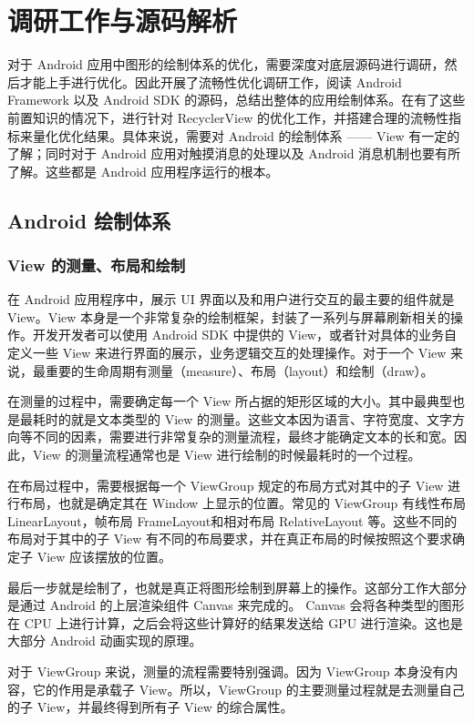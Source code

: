\chapter{调研工作与源码解析}

对于 Android 应用中图形的绘制体系的优化，需要深度对底层源码进行调研，然后才能上手进行优化。因此开展了流畅性优化调研工作，阅读 Android Framework 以及 Android SDK 的源码，总结出整体的应用绘制体系。在有了这些前置知识的情况下，进行针对 RecyclerView 的优化工作，并搭建合理的流畅性指标来量化优化结果。具体来说，需要对 Android 的绘制体系 —— View 有一定的了解；同时对于 Android 应用对触摸消息的处理以及 Android 消息机制也要有所了解。这些都是 Android 应用程序运行的根本。

\section{Android 绘制体系}

\subsection{View 的测量、布局和绘制}

在 Android 应用程序中，展示 UI 界面以及和用户进行交互的最主要的组件就是 View。View 本身是一个非常复杂的绘制框架，封装了一系列与屏幕刷新相关的操作。开发开发者可以使用 Android SDK 中提供的 View，或者针对具体的业务自定义一些 View 来进行界面的展示，业务逻辑交互的处理操作。对于一个 View 来说，最重要的生命周期有测量（measure）、布局（layout）和绘制（draw）\cite{rountev2014static}。

在测量的过程中，需要确定每一个 View 所占据的矩形区域的大小。其中最典型也是最耗时的就是文本类型的 View 的测量。这些文本因为语言、字符宽度、文字方向等不同的因素，需要进行非常复杂的测量流程，最终才能确定文本的长和宽。因此，View 的测量流程通常也是 View 进行绘制的时候最耗时的一个过程。

在布局过程中，需要根据每一个 ViewGroup 规定的布局方式对其中的子 View 进行布局，也就是确定其在 Window 上显示的位置。常见的 ViewGroup 有线性布局 LinearLayout，帧布局 FrameLayout和相对布局 RelativeLayout 等。这些不同的布局对于其中的子 View 有不同的布局要求，并在真正布局的时候按照这个要求确定子 View 应该摆放的位置。

最后一步就是绘制了，也就是真正将图形绘制到屏幕上的操作。这部分工作大部分是通过 Android 的上层渲染组件 Canvas 来完成的。 Canvas 会将各种类型的图形在 CPU 上进行计算，之后会将这些计算好的结果发送给 GPU 进行渲染。这也是大部分 Android 动画实现的原理。

对于 ViewGroup 来说，测量的流程需要特别强调。因为 ViewGroup 本身没有内容，它的作用是承载子 View。所以，ViewGroup 的主要测量过程就是去测量自己的子 View，并最终得到所有子 View 的综合属性。

